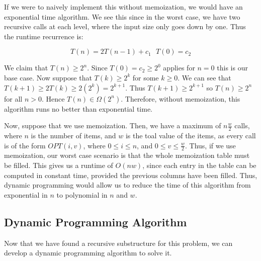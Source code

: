 \documentclass{article}
\begin{document}
If we were to naively implement this without memoization, we would have an exponential time algorithm.  We see this since in the worst case, we have two recursive calls at each level, where the input size only goes down by one.  Thus the runtime recurrence is:

\[T(n) = 2T(n-1) + c_1 ~~~ T(0) = c_2 \]


We claim that $T(n) \geq 2^{n}$. Since $T(0) = c_2 \geq 2^0$ applies for $n=0$ this is our base case.  Now suppose that $T(k) \geq 2^k$ for some $k \geq 0$.  We can see that  $T(k+1) \geq 2T(k) \geq 2(2^{k}) = 2^{k+1} $. Thus $T(k+1) \geq 2^{k+1}$ so $T(n) \geq 2^n$ for all $n > 0$. Hence $T(n) \in \Omega(2^n)$. Therefore, without memoization, this algorithm runs no better than exponential time.

Now, suppose that we use memoization.  Then, we have a maximum of $n\frac{w}{2}$ calls, where $n$ is the number of items, and $w$ is the toal value of the items, as every call is of the form $OPT(i,v)$, where $0 \leq i \leq n$, and $0 \leq v \leq \frac{w}{2}$.  Thus, if we use memoization, our worst case scenario is that the whole memoization table must be filled.  This gives us a runtime of $O(nw)$, since each entry in the table can be computed in constant time, provided the previous columns have been filled.  Thus, dynamic programming would allow us to reduce the time of this algorithm from exponential in $n$ to polynomial in $n$ and $w$.

\newpage

\subsection{Dynamic Programming Algorithm}

Now that we have found a recursive substructure for this problem, we can develop a dynamic programming algorithm to solve it.  
\end{document}
